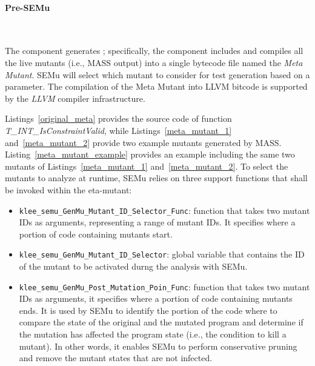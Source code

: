 




\paragraph{Pre-SEMu}\

The  component generates ; specifically, the component includes and compiles all the live mutants (i.e., MASS output) into a single bytecode file named the \emph{Meta Mutant}. SEMu will select which mutant to consider for test generation based on a parameter. The compilation of the Meta Mutant into LLVM bitcode is supported by the \emph{LLVM} compiler infrastructure.



Listings~\ref{original_meta} provides the source code of function \emph{T\_INT\_IsConstraintValid}, while Listings~\ref{meta_mutant_1} and~\ref{meta_mutant_2} provide two example mutants generated by MASS.
Listing~\ref{meta_mutant_example} provides an example  including the same two mutants of Listings~\ref{meta_mutant_1} and~\ref{meta_mutant_2}.
To select the mutants to analyze at runtime, SEMu relies on three support functions that shall be invoked within the eta-mutant:

\begin{itemize}
	\item \texttt{klee\_semu\_GenMu\_Mutant\_ID\_Selector\_Func}: function that takes two mutant IDs as arguments, representing a range of mutant IDs. It specifies where a portion of code containing mutants start.
    \item \texttt{klee\_semu\_GenMu\_Mutant\_ID\_Selector}: global variable that contains the ID of the mutant to be activated durng the analysis with SEMu.
	\item \texttt{klee\_semu\_GenMu\_Post\_Mutation\_Poin\_Func}:
	function that takes two mutant IDs as arguments, it specifies where a portion of code containing mutants ends.
	It is used by SEMu to identify the portion of the code where to compare the state of the original and the mutated program and determine if the mutation has affected the program state (i.e., the  condition to kill a mutant). In other words, it enables SEMu to perform conservative pruning and remove the mutant states that are not infected.
\end{itemize}

